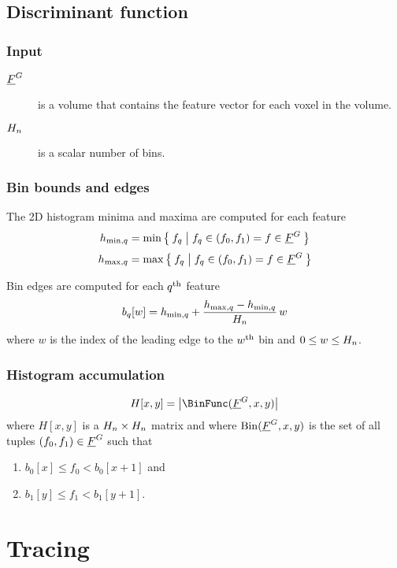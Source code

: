 \documentclass[12pt]{article}
\begin{document}
\subsection{Discriminant function}

\subsubsection{Input}

\begin{description}
	\item[\(\underline{F}^{G}\)] is a volume that contains the feature vector for each
		voxel in the volume.
	\item[\(H_{n}\)] is a scalar number of bins.
\end{description}

\subsubsection{Bin bounds and edges}

The 2D histogram minima and maxima are computed for each feature
\begin{equation*}
	h_{\mathrm{min},q} = \min \Set{ f_{q} | f_{q} \in ( f_0, f_1 ) = f \in \underline{F}^{G}}
\end{equation*}
\begin{equation*}
	h_{\mathrm{max},q} = \max \Set{ f_{q} | f_{q} \in ( f_0, f_1 ) = f \in \underline{F}^{G}}
\end{equation*}

Bin edges are computed for each \({q}^{\mathrm{th}}\) feature
\begin{equation*}
	b_{q}[w] =
		h_{\mathrm{min},q} +
		\frac{ h_{\mathrm{max},q}  - h_{\mathrm{min},q}  }
		     { H_{n} } \, w
\end{equation*}
where \(w\) is the index of the leading edge to the
\(w^{\mathrm{th}}\) bin and \( 0 \le w \le  H_{n} \).

\subsubsection{Histogram accumulation}

\begin{equation*}
	H[x,y] =  \Dim{ \BinFunc(\FeaturesName, x, y) }
\end{equation*}
where \(H[x,y]\) is a \(H_{n} \times H_{n}\) matrix and
where \(\operatorname{Bin}(\underline{F}^{G}, x, y)\) is the set of all tuples
\((f_0, f_1) \in \underline{F}^{G}\) such that
\begin{enumerate}
	\item \(b_0[x] \le f_0 < b_0[x+1]\) and
	\item \(b_1[y] \le f_1 < b_1[y+1]\).
\end{enumerate}



\section{Tracing}
\end{document}
